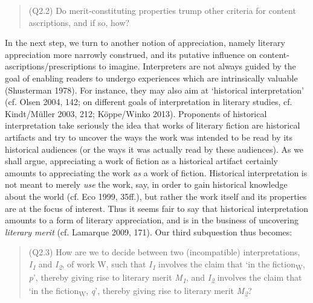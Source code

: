 \vspace{-.2cm}
\begin{quote}
(Q2.2)  Do merit-constituting properties trump other criteria for content ascriptions, and if so, how?
\end{quote}
\vspace{-.2cm}

\noindent In the next step, we turn to another notion of appreciation, namely literary appreciation more narrowly construed, and its putative influence on content-ascriptions/prescriptions to imagine. Interpreters are not always guided by the goal of enabling readers to undergo experiences which are intrinsically valuable (Shusterman 1978). For instance, they may also aim at `historical interpretation' (cf. Olsen 2004, 142; on different goals of interpretation in literary studies, cf. Kindt/M\"uller 2003, 212; K\"oppe/Winko 2013). Proponents of historical interpretation take seriously the idea that works of literary fiction are historical artifacts and try to uncover the ways the work was intended to be read by its historical audiences (or the ways it was actually read by these audiences). As we shall argue, appreciating a work of fiction as a historical artifact certainly amounts to appreciating the work \emph{as} a work of fiction. Historical interpretation is not meant to merely \emph{use} the work, say, in order to gain historical knowledge about the world (cf. Eco 1999, 35ff.), but rather the work itself and its properties are at the focus of interest. Thus it seems fair to say that historical interpretation amounts to a form of literary appreciation, and is in the business of uncovering \emph{literary merit} (cf. Lamarque 2009, 171). Our third subquestion thus becomes:

\vspace{-.2cm}
\begin{quote}
(Q2.3)  How are we to decide between two (incompatible) interpretations, \emph{I\textsubscript{1}} and \emph{I\textsubscript{2}}, of work W, such  that \emph{I\textsubscript{1}} involves the claim that `in the fiction\textsubscript{W}, \emph{p}', thereby giving rise to literary merit \emph{M\textsubscript{1}}, and  \emph{I\textsubscript{2}} involves the claim that `in the fiction\textsubscript{W}, \emph{q}', thereby giving rise to literary merit \emph{M\textsubscript{2}}?
\end{quote}
\vspace{-.2cm}

